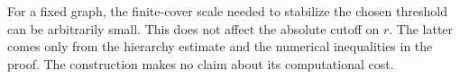 \begin{remark}\label{rem:uniform-extraction}
For a fixed graph, the finite-cover scale needed to stabilize the
chosen threshold can be arbitrarily small. This does not affect the
absolute cutoff on \(r\). The latter comes only from the hierarchy
estimate and the numerical inequalities in the proof.
The construction makes no claim about its computational cost.
\end{remark}
